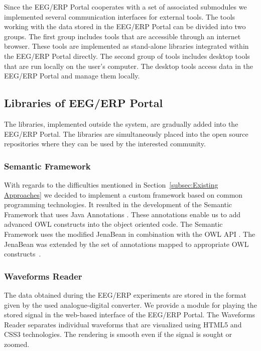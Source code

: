\documentclass[a4paper,twoside]{article}
\begin{document}
\noindent Since the EEG/ERP Portal cooperates with a set of associated submodules we implemented several communication interfaces for external tools. The tools working with the data stored in the EEG/ERP Portal can be divided into two groups. The first group includes tools that are accessible through an internet browser. These tools are implemented as stand-alone libraries integrated within the EEG/ERP Portal directly. The second group of tools includes desktop tools that are run locally on the user's computer. The desktop tools access data in the EEG/ERP Portal and manage them locally.

\subsection{Libraries of EEG/ERP Portal}

The libraries, implemented outside the system, are gradually added into the EEG/ERP Portal. The libraries are simultaneously placed into the open source repositories where they can be used by the interested community.

\subsubsection{Semantic Framework}

With regards to the difficulties mentioned in Section~\ref{subsec:Existing Approaches} we decided to implement a custom framework based on common programming technologies. It resulted in the development of the Semantic Framework that uses Java Annotations \cite{JavaAnnotations}. These annotations enable us to add advanced OWL constructs into the object oriented code. The Semantic Framework uses the modified JenaBean \cite{jena} in combination with the OWL API \cite{owl}. The JenaBean was extended by the set of annotations mapped to appropriate OWL constructs~\cite{DBLP:conf/iceis/MoucekJ10}.


\subsubsection{Waveforms Reader}

The data obtained during the EEG/ERP experiments are stored in the format given by the used analogue-digital converter. We provide a module for playing the stored signal in the web-based interface of the EEG/ERP Portal. The Waveforms Reader separates individual waveforms that are visualized using HTML5 and CSS3 technologies. The rendering is smooth even if the signal is sought or zoomed.
\end{document}
